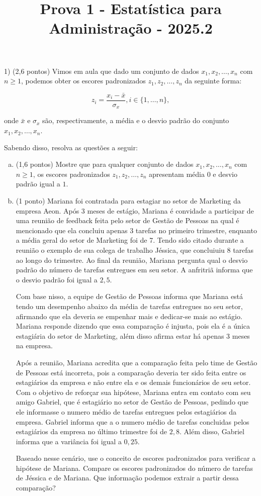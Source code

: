 \documentclass[12pt]{article}
\title{Prova 1 - Estatística para Administração - 2025.2}
\date{}
\makeatletter
\renewcommand{\maketitle}{
  \begin{center}
    {\small\bfseries \@title \par}
  \end{center}
  \vspace{-0.1cm} %
}
\makeatother
\begin{document}
\maketitle


1) (2,6 pontos) Vimos em aula que dado um  conjunto de dados $x_1, x_2, \dots, x_n$ com $n \geq 1$, podemos obter os escores padronizados $z_1, z_2, \dots, z_n$ da seguinte forma:


$$z_i = \dfrac{x_i - \bar{x}}{\sigma_x}, i\in \{1, \dots, n\},$$

onde $\bar{x}$ e $\sigma_x$ são, respectivamente, a média e o desvio padrão do conjunto $x_1, x_2, \dots, x_n$.

Sabendo disso, resolva as questões a seguir:

\begin{enumerate}[a)]
    \item (1,6 pontos) Mostre que para qualquer conjunto de dados $x_1, x_2, \dots, x_n$ com $n \geq 1$, os escores padronizados $z_1, z_2, \dots, z_n$  apresentam média $0$ e desvio padrão igual a $1$. 
    
    \item (1 ponto) Mariana foi contratada para estagiar no setor de Marketing da empresa Aeon. 
    Após 3 meses de estágio, Mariana é convidade a participar de uma reunião de feedback feita pelo setor de Gestão de Pessoas
     na qual é mencionado que ela concluiu apenas 3 tarefas no primeiro trimestre, enquanto a média geral do setor de Marketing foi de 7. Tendo sido citado 
     durante a reunião o  exemplo de sua colega de trabalho Jéssica, que concluiuiu $8$ tarefas ao longo do trimestre. Ao final da reunião, Mariana pergunta qual o desvio padrão 
     do número de tarefas entregues em seu setor. A anfritriã informa que o desvio padrão foi igual a $2,5$.

     Com base nisso, a equipe de Gestão de Pessoas informa que Mariana está tendo um desempenho abaixo da média de tarefas entregues no seu setor, 
     afirmando que ela deveria se empenhar mais e dedicar-se mais ao estágio. 
    Mariana responde dizendo que essa comparação é injusta, pois ela é a única estagiária do setor de Marketing, além disso afirma estar há apenas 3 meses na empresa. 


Após a reunião, Mariana acredita que a comparação feita pelo time de Gestão de Pessoas está incorreta, pois a comparação deveria ter sido feita entre os estagiários 
da empresa e não entre ela e os demais funcionários de seu setor.
Com o objetivo de reforçar sua hipótese, Mariana entra em contato com seu amigo Gabriel, que é estagiário no setor de Gestão de Pessoas, 
pedindo que ele informasse o numero médio de tarefas entregues pelos estagiários da empresa. Gabriel informa que a o numero médio de tarefas concluidas 
pelos estagiários da empresa no último trimestre foi de $2,8$. Além disso, Gabriel informa que a variância foi igual a $0,25$.

Baseado nesse cenário, use o conceito de escores padronizados para verificar a hipótese de Mariana. Compare os escores padronizados do número de tarefas de Jéssica 
e de Mariana. Que informação podemos extrair a partir dessa comparação? 
\end{enumerate}
\end{document}
